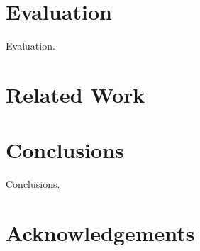 \documentclass[letterpaper]{article}
\begin{document}
\section{Evaluation}


Evaluation.


\newpage


\mbox{}


\newpage


\mbox{}


\newpage


\section{Related Work}



\section{Conclusions}


Conclusions.


\section{Acknowledgements}






\end{document}
